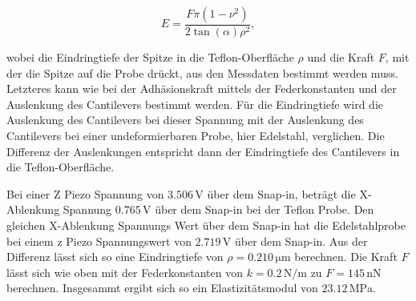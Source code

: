 \begin{equation}
    E=\frac{F\pi(1-\nu^2)}{2\tan(\alpha)\rho^2},
\end{equation}

wobei die Eindringtiefe der Spitze in die Teflon-Oberfläche $\rho$ und die Kraft $F$, mit der die Spitze auf die Probe drückt, aus den Messdaten bestimmt werden muss.
Letzteres kann wie bei der Adhäsionskraft mittels der Federkonstanten und der Auslenkung des Cantilevers bestimmt werden.
Für die Eindringtiefe wird die Auslenkung des Cantilevers bei dieser Spannung mit der Auslenkung des Cantilevers bei einer undeformierbaren Probe, hier Edelstahl, verglichen.
Die Differenz der Auslenkungen entspricht dann der Eindringtiefe des Cantilevers in die Teflon-Oberfläche.

Bei einer Z Piezo Spannung von $3.506\,\si{\volt}$ über dem Snap-in,
beträgt die X-Ablenkung Spannung $0.765\,\si{\volt}$ über dem Snap-in bei der Teflon Probe.
Den gleichen X-Ablenkung Spannungs Wert über dem Snap-in hat die Edelstahlprobe bei einem z Piezo Spannungswert von $2.719\,\si{\volt}$ über dem Snap-in.
Aus der Differenz lässt sich so eine Eindringtiefe von $\rho=0.210\,\si{\micro\meter}$ berechnen.
Die Kraft $F$ lässt sich wie oben mit der Federkonstanten von $k=0.2\,\si{\newton\per\meter}$ zu $F=145\,\si{\nano\newton}$ berechnen.
Insgesammt ergibt sich so ein Elastizitätsmodul von $23.12\,\si{\mega\pascal}$.